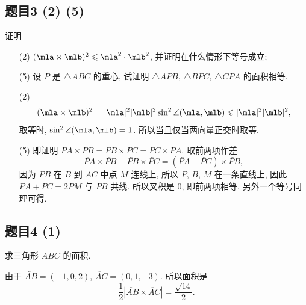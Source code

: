 \subsection*{ 题目3 (2) (5) }
\begin{problem*}
    证明
\begin{enumerate}
    \item[(2)] $(\mla \times \mlb)^2 \leqslant \mla^2 \cdot \mlb^2$, 并证明在什么情形下等号成立;
    \item[(5)] 设 $P$ 是 $\triangle ABC$ 的重心, 试证明 $\triangle APB$, $\triangle BPC$, $\triangle CPA$ 的面积相等. 
\end{enumerate}
\end{problem*}
\begin{solution}
    \begin{enumerate}
        \item[(2)] 
        \[
            (\mla \times \mlb)^2 = |\mla|^2 |\mlb|^2 \sin^2 \angle(\mla, \mlb) \leqslant |\mla|^2 |\mlb|^2,
        \]
        取等时, $\sin^2 \angle(\mla, \mlb) = 1$. 所以当且仅当两向量正交时取等.
        
        \item[(5)] 即证明 $\lvec{PA} \times \lvec{PB} = \lvec{PB} \times \lvec{PC} = \lvec{PC} \times \lvec{PA}$. 取前两项作差
        \[
            \lvec{PA} \times \lvec{PB} - \lvec{PB} \times \lvec{PC} = (\lvec{PA} + \lvec{PC}) \times \lvec{PB},
        \]
        因为 $PB$ 在 $B$ 到 $AC$ 中点 $M$ 连线上, 所以 $P$, $B$, $M$ 在一条直线上, 因此 $\lvec{PA} + \lvec{PC} = 2\lvec{PM}$ 与 $\lvec{PB}$ 共线. 所以叉积是 $0$, 即前两项相等. 另外一个等号同理可得.
    \end{enumerate}
\end{solution}

\subsection*{ 题目4 (1) }
\begin{problem*}
求三角形 $ABC$ 的面积.
\end{problem*}
\begin{solution}
由于 $\lvec{AB} = (-1, 0, 2)$, $\lvec{AC} = (0, 1, -3)$. 所以面积是
\[
    \frac{1}{2}|\lvec{AB} \times \lvec{AC}| = \frac{\sqrt{14}}{2}. 
\]
\end{solution}

\newpage
